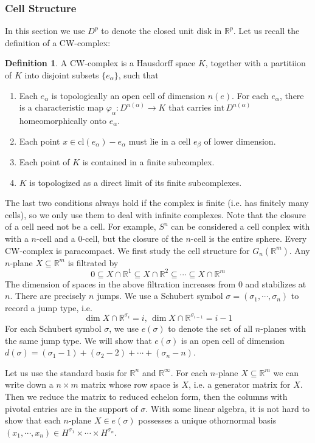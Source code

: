\documentclass[12pt]{article}
\theoremstyle{plain}
\theoremstyle{definition}
\newtheorem{definition}[equation]{Definition}
\newcommand{\IR}{\mathbb{R}}
\newcommand{\<}{\langle}
\renewcommand{\>}{\rangle}
\newcommand{\cl}{\mathrm{cl}}
\newcommand{\intr}{\mathrm{int}\,}
\begin{document}
\subsubsection{Cell Structure}
In this section we use $D^p$ to denote the closed unit disk in $\IR^p$. 
Let us recall the definition of a CW-complex:
\begin{definition} A CW-complex is a Hausdorff space $K$, together with a partitiion of $K$ into disjoint subsets $\{ e_\alpha \}$, such that 
\begin{enumerate}
\item Each $e_\alpha$ is topologically an open cell of dimension $n(e)$. For each $e_\alpha$, there is a characteristic map $\varphi_\alpha : D^{n(\alpha)} \to K$ that carries $\intr D^{n(\alpha)}$ homeomorphically onto $e_\alpha$. 
\item Each point $x \in \cl(e_\alpha) - e_\alpha$ must lie in a cell $e_\beta$ of lower dimension. 
\item Each point of $K$ is contained in a finite subcomplex. 
\item $K$ is topologized as a direct limit of its finite subcomplexes. 
\end{enumerate}
\end{definition}
The last two conditions always hold if the complex is finite (i.e. has finitely many cells), so we only use them to deal with infinite complexes. 
Note that the closure of a cell need not be a cell. For example, $S^n$ can be considered a cell conplex with with a $n$-cell and a $0$-cell, but the closure of the $n$-cell is the entire sphere. Every CW-complex is paracompact. 
We first study the cell structure for $G_n(\IR^m)$. Any $n$-plane $X \subseteq \IR^m$ is filtrated by 
$$0 \subseteq X \cap \IR^1 \subseteq X \cap \IR^2 \subseteq \cdots \subseteq X \cap \IR^m $$ 
The dimension of spaces in the above filtration increases from $0$ and stabilizes at $n$. There are precisely $n$ jumps. We use a Schubert symbol $\sigma = ( \sigma_1, \cdots, \sigma_n)$ to record a jump type, i.e. $$ \dim X \cap \IR^{\sigma_i} = i, \, \dim X \cap \IR^{\sigma_{i-1}} = i - 1$$
For each Schubert symbol $\sigma$, we use $e(\sigma)$ to denote the set of all $n$-planes with the same jump type. We will show that $e(\sigma)$ is an open cell of dimension $d(\sigma) = (\sigma_1 - 1) + (\sigma_2 - 2) + \cdots + (\sigma_n - n)$. 

Let us use the standard basis for $\IR^n$ and $\IR^\infty$. For each $n$-plane $X \subseteq \IR^m$ we can write down a $n \times m$ matrix whose row space is $X$, i.e. a generator matrix for $X$. Then we reduce the matrix to reduced echelon form, then the columns with pivotal entries are in the support of $\sigma$. With some linear algebra, it is not hard to show that each $n$-plane $X \in e(\sigma)$ possesses a unique othornormal basis $(x_1, \cdots, x_n) \in H^{\sigma_1} \times \cdots \times H^{\sigma_n}$. 
\end{document}
